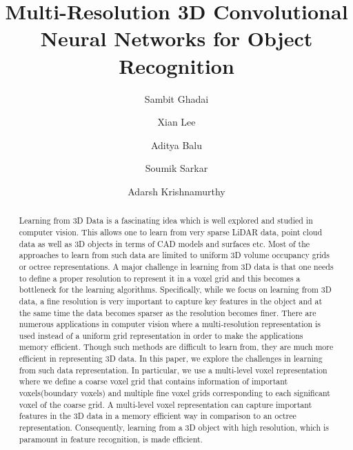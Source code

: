 \documentclass[10pt,letterpaper]{article}
\begin{document}
\title{\selectfont\LARGE{Multi-Resolution 3D Convolutional Neural Networks for Object Recognition}}

\author{\selectfont\large
Sambit Ghadai}
\author{Xian Lee}
\author{Aditya Balu}
\author{Soumik Sarkar}
\author{Adarsh Krishnamurthy}
\date{}
\maketitle

\begin{abstract}
Learning from 3D Data is a fascinating idea which is well explored and studied in computer vision. This allows one to learn from very sparse LiDAR data, point cloud data as well as 3D objects in terms of CAD models and surfaces etc. Most of the approaches to learn from such data are limited to uniform 3D volume occupancy grids or octree representations. A major challenge in learning from 3D data is that one needs to define a proper resolution to represent it in a voxel grid and this becomes a bottleneck for the learning algorithms. Specifically, while we focus on learning from 3D data, a fine resolution is very important to capture key features in the object and at the same time the data becomes sparser as the resolution becomes finer. There are numerous applications in computer vision where a multi-resolution representation is used instead of a uniform grid representation in order to make the applications memory efficient. Though such methods are difficult to learn from, they are much more efficient in representing 3D data. In this paper, we explore the challenges in learning from such data representation. In particular, we use a multi-level voxel representation where we define a coarse voxel grid that contains information of important voxels(boundary voxels) and multiple fine voxel grids corresponding to each significant voxel of the coarse grid. A multi-level voxel representation can capture important features in the 3D data in a memory efficient way in comparison to an octree representation. Consequently, learning from a 3D object with high resolution, which is paramount in feature recognition, is made efficient.
\end{abstract}
\end{document}
